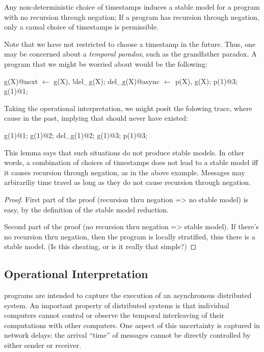 \begin{lemma}
Any non-deterministic choice of timestamps induces a stable model for a \lang program with no recursion through negation; If a \lang program has recursion through negation, only a causal choice of timestamps is permissible.
\end{lemma}

Note that we have not restricted  to choose a timestamp in the future.  Thus, one may be concerned about a {\em temporal paradox}, such as the grandfather paradox.  A program that we might be worried about would be the following:

\begin{Dedalus}
g(X)@next \(\leftarrow\) g(X), !del_g(X);
del_g(X)@async \(\leftarrow\) p(X), g(X);
p(1)@3;
g(1)@1;
\end{Dedalus}

Taking the operational interpretation, we might posit the folowing trace, where  cause  in the past, implying that  should never have existed:

\begin{Dedalus}
g(1)@1;
g(1)@2;
del_g(1)@2;
g(1)@3;
p(1)@3;
\end{Dedalus}

This lemma says that such situations do not produce stable models.  In other words, a combination of choices of timestamps does not lead to a stable model iff it causes recursion through negation, as in the above example.  Messages may arbirariliy time travel as long as they do not cause recursion through negation.

\begin{proof}

First part of the proof (recursion thru negation => no stable model) is easy, by the definition of the stable model reduction.

Second part of the proof (no recursion thru negation => stable model).  If there's no recursion thru negation, then the program is locally stratified, thus there is a stable model.  (Is this cheating, or is it really that simple?)

\end{proof}

\subsection{Operational Interpretation}
\lang programs are intended to capture the execution of an asynchronous distributed system.  An important property of distributed systems is that individual computers cannot control or observe the temporal interleaving of their computations with other computers.  One aspect of this uncertainty is captured in network delays: the arrival ``time'' of messages cannot be directly controlled by either sender or receiver.

